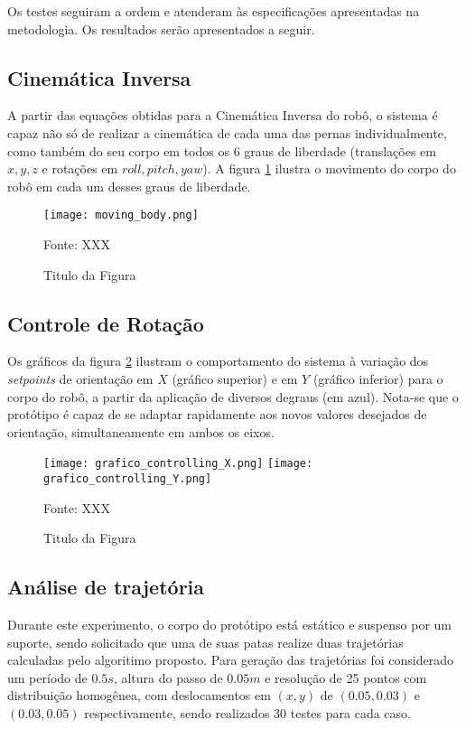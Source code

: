 \documentclass[../main.tex]{subfiles}
\begin{document}
  Os testes seguiram a ordem e atenderam às especificações apresentadas na metodologia. Os resultados serão apresentados a seguir.

  \subsection{Cinemática Inversa}

  A partir das equações obtidas para a Cinemática Inversa do robô, o sistema é capaz não só de realizar a cinemática de cada uma das pernas individualmente, como também do seu corpo em todos os 6 graus de liberdade (translações em $x, y, z$ e rotações em $roll, pitch, yaw$). A figura \ref{fig:moving_body} ilustra o movimento do corpo do robô em cada um desses graus de liberdade.

  \begin{figure}[h]
    \centering
    \caption{Titulo da Figura}
    \texttt{[image: moving\_body.png]}
    
    Fonte: XXX
    \label{fig:moving_body}
  \end{figure}

  \subsection{Controle de Rotação}

  Os gráficos da figura \ref{fig:grafico_controlling} ilustram o comportamento do sistema à variação dos \textit{setpoints} de orientação em $X$ (gráfico superior) e em $Y$ (gráfico inferior) para o corpo do robô, a partir da aplicação de diversos degraus (em azul). Nota-se que o protótipo é capaz de se adaptar rapidamente aos novos valores desejados de orientação, simultaneamente em ambos os eixos.

  \begin{figure}[h]
    \centering
    \caption{Titulo da Figura}
    \texttt{[image: grafico\_controlling\_X.png]}
    \texttt{[image: grafico\_controlling\_Y.png]}
    
    Fonte: XXX
    \label{fig:grafico_controlling}
  \end{figure}

  \subsection{Análise de trajetória}
  Durante este experimento, o corpo do protótipo está estático e suspenso por um suporte, sendo solicitado que uma de suas patas realize duas trajetórias calculadas pelo algoritimo proposto. Para geração das trajetórias foi considerado um período de $0.5 s$, altura do passo de $0.05 m$ e resolução de 25 pontos com distribuição homogênea, com deslocamentos em $(x, y)$ de $(0.05, 0.03)$ e $(0.03, 0.05)$ respectivamente, sendo realizados 30 testes para cada caso. 
  
\end{document}
